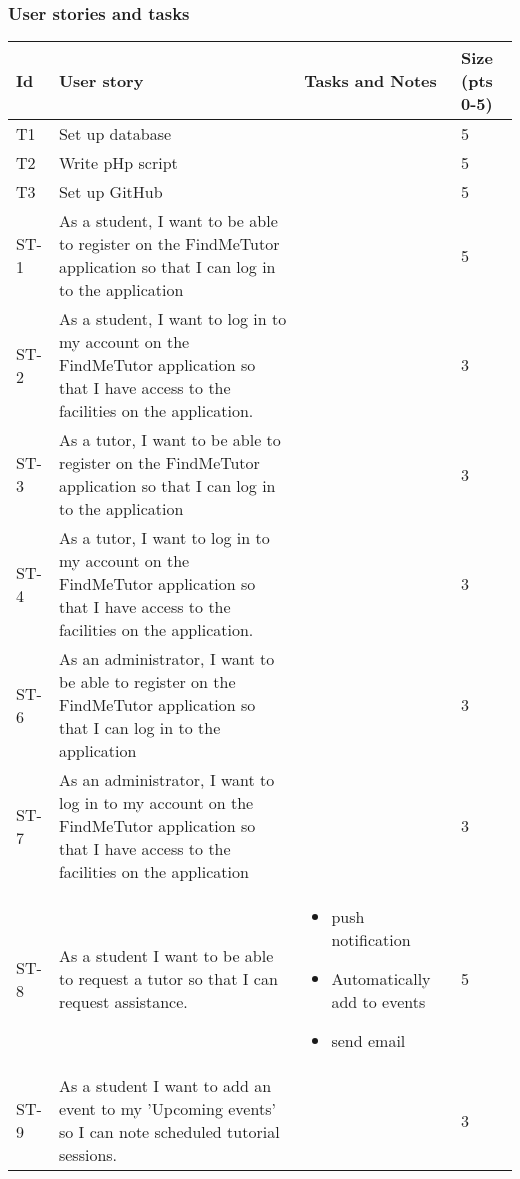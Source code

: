 \documentclass[12pt]{article}
\begin{document}
\subsubsection{User stories and tasks}
{
\centering
\begin{longtable}{| p{1cm} | p{7cm}| p{5cm} | p{1cm} |}
			\hline			
			\textbf{Id} & \textbf{User story} & \textbf{Tasks and Notes} & \textbf{Size (pts 0-5)}

			\\ \hline T1 & Set up database   &  & 5		
			\\ \hline T2 & Write pHp script  &  & 5	
			\\ \hline T3 & Set up GitHub  &  & 5	
			
			
			\\ \hline ST-1 & As a student, I want to be able to register on the FindMeTutor application so that I can log in to the application  & & 5 
			\\ \hline ST-2 & As a student, I want to  log in to my account on the FindMeTutor application so that I have access to the facilities on the application.  &  & 3 
			\\ \hline ST-3 & As a tutor, I want to be able to register on the FindMeTutor application so that I can log in to the application  & & 3 
																\\ \hline ST-4 & As a tutor, I want to  log in to my account on the FindMeTutor application so that I have access to the facilities on the application.  &  & 3 
																\\ \hline ST-6 & As an administrator, I want to be able to register on the FindMeTutor application so that I can log in to the application  & & 3 
													\\ \hline ST-7 & As an administrator, I want to  log in to my account on the FindMeTutor application so that I have access to the facilities on the application  & &3 			

			\\ \hline ST-8 & As a student I want to be able to request a tutor so that I can request assistance. & \begin{itemize}
\item push notification
\item Automatically add to events
\item send email
\end{itemize} & 5 													
			\\ \hline ST-9 & As a student I want to add an event to my 'Upcoming events' so I can note scheduled tutorial sessions.  &  &3 
			

\end{longtable}}
\end{document}
